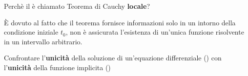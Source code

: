 \begin{exercise}
	Perchè il  è chiamato Teorema di Cauchy \textbf{locale}?
	\begin{solution}
		È dovuto al fatto che il teorema fornisce informazioni solo in un intorno della condizione iniziale $t_0$, non è assicurata l'esistenza di un'unica funzione risolvente in un intervallo arbitrario.
	\end{solution}
\end{exercise}

\begin{exercise}
	Confrontare l'\textbf{unicità} della soluzione di un'equazione differenziale () con l'\textbf{unicità} della funzione implicita ()
\end{exercise}

